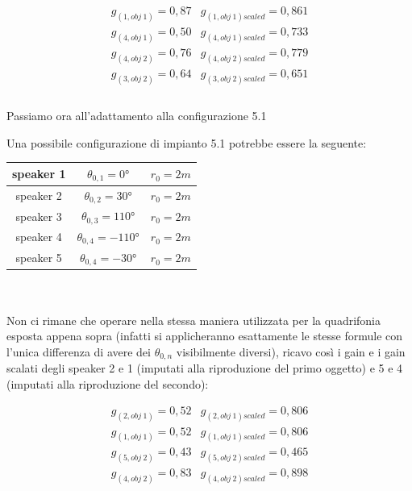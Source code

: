 \documentclass[12pt,a4paper]{report}
\begin{document}
\begin{equation}
\begin{matrix}
g_{(1,obj\ 1)} = 0,87 & g_{(1,obj\ 1)scaled} = 0,861\\
g_{(4,obj\ 1)} = 0,50 & g_{(4,obj\ 1)scaled} = 0,733\\
g_{(4,obj\ 2)} = 0,76 & g_{(4,obj\ 2)scaled} = 0,779\\
g_{(3,obj\ 2)} = 0,64 & g_{(3,obj\ 2)scaled} = 0,651\\
\end{matrix}
\label{gscalatiesempio1}
\end{equation}
\\

Passiamo ora all'adattamento alla configurazione 5.1

Una possibile configurazione di impianto 5.1 potrebbe essere la seguente:

\begin{tabular}{|c|c|c|}
\hline
speaker 1 & $\theta_{0,1}=0°$ & $r_0=2m$\\
\hline
speaker 2 & $\theta_{0,2}=30°$ & $r_0=2m$\\
\hline
speaker 3 & $\theta_{0,3}=110°$ & $r_0=2m$\\
\hline
speaker 4 & $\theta_{0,4}=-110°$ & $r_0=2m$\\
\hline
speaker 5 & $\theta_{0,4}=-30°$ & $r_0=2m$\\
\hline
\end{tabular} \\
\\

Non ci rimane che operare nella stessa maniera utilizzata per la quadrifonia esposta appena sopra (infatti si applicheranno esattamente le stesse formule con l'unica differenza di avere dei $\theta_{0,n}$ visibilmente diversi), ricavo così i gain e i gain scalati degli speaker 2 e 1 (imputati alla riproduzione del primo oggetto) e 5 e 4 (imputati alla riproduzione del secondo):

\begin{equation}
\begin{matrix}
g_{(2,obj\ 1)} = 0,52 & g_{(2,obj\ 1)scaled} = 0,806\\
g_{(1,obj\ 1)} = 0,52 & g_{(1,obj\ 1)scaled} = 0,806\\
g_{(5,obj\ 2)} = 0,43 & g_{(5,obj\ 2)scaled} = 0,465\\
g_{(4,obj\ 2)} = 0,83 & g_{(4,obj\ 2)scaled} = 0,898  \\

\end{matrix}
\label{gscalatiesempio2}
\end{equation} \\
\end{document}

